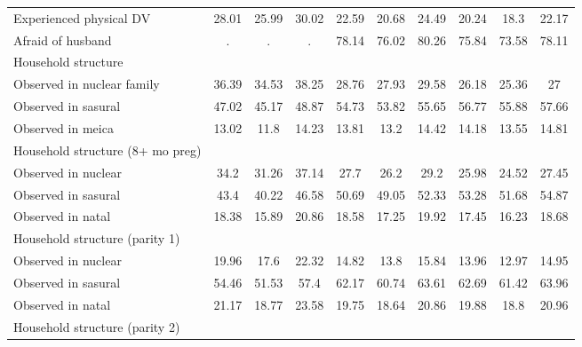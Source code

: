 \begin{tabular}{l*{9}{c}}
Experienced physical DV&       28.01&       25.99&       30.02&       22.59&       20.68&       24.49&       20.24&        18.3&       22.17\\
Afraid of husband   &           .&           .&           .&       78.14&       76.02&       80.26&       75.84&       73.58&       78.11\\
\midrule
Household structure &            &            &            &            &            &            &            &            &            \\
Observed in nuclear family&       36.39&       34.53&       38.25&       28.76&       27.93&       29.58&       26.18&       25.36&          27\\
Observed in sasural &       47.02&       45.17&       48.87&       54.73&       53.82&       55.65&       56.77&       55.88&       57.66\\
Observed in meica   &       13.02&        11.8&       14.23&       13.81&        13.2&       14.42&       14.18&       13.55&       14.81\\
\midrule
Household structure (8+ mo preg)&            &            &            &            &            &            &            &            &            \\
Observed in nuclear &        34.2&       31.26&       37.14&        27.7&        26.2&        29.2&       25.98&       24.52&       27.45\\
Observed in sasural &        43.4&       40.22&       46.58&       50.69&       49.05&       52.33&       53.28&       51.68&       54.87\\
Observed in natal   &       18.38&       15.89&       20.86&       18.58&       17.25&       19.92&       17.45&       16.23&       18.68\\
\midrule
Household structure (parity 1)&            &            &            &            &            &            &            &            &            \\
Observed in nuclear &       19.96&        17.6&       22.32&       14.82&        13.8&       15.84&       13.96&       12.97&       14.95\\
Observed in sasural &       54.46&       51.53&        57.4&       62.17&       60.74&       63.61&       62.69&       61.42&       63.96\\
Observed in natal   &       21.17&       18.77&       23.58&       19.75&       18.64&       20.86&       19.88&        18.8&       20.96\\
\midrule
Household structure (parity 2)&            &            &            &            &            &            &            &            &            \\

\end{tabular}
